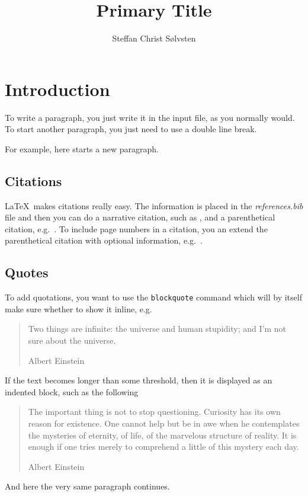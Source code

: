 \documentclass[
    a4paper, %
    stu,     %
]{apa7}
\title{Primary Title}
\author{Steffan Christ S{\o}lvsten}
\affiliation{Department of Computer Science, Aarhus University}
\begin{document}
\maketitle
\section{Introduction}
To write a paragraph, you just write it in the input file, as you normally
would. To start another paragraph, you just need to use a double line break.

For example, here starts a new paragraph.

\subsection{Citations}
\LaTeX\ makes citations really easy. The information is placed in the
\emph{references.bib} file and then you can do a narrative citation, such as
\textcite{soelvsten2022:TACAS}, and a parenthetical citation,
e.g.~\parencite{soelvsten2022:TACAS}. To include page numbers in a citation, you 
an extend the parenthetical citation with optional information,
e.g.~\parencite[p.~64]{soelvsten2022:TACAS}.

\subsection{Quotes}
To add quotations, you want to use the \texttt{blockquote} command which will by
itself make sure whether to show it inline, e.g.\
\blockquote[Albert Einstein]{Two things are infinite: the universe and human
stupidity; and I'm not sure about the universe.}
If the text becomes longer than some threshold, then it is displayed
as an indented block, such as the following
\blockquote[Albert Einstein]{The important thing is not to stop questioning.
Curiosity has its own reason for existence. One cannot help but be in awe when he
contemplates the mysteries of eternity, of life, of the marvelous structure of
reality. It is enough if one tries merely to comprehend a little of this mystery
each day.}
And here the very same paragraph continues.

\printbibliography
\end{document}
